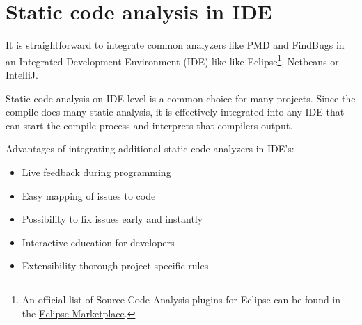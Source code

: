 \documentclass[conference]{IEEEtran}
\begin{document}



\section{Static code analysis in IDE}
\label{sec:static_code_analysis_ide}
It is straightforward to integrate common analyzers like PMD and FindBugs in an Integrated Development Environment (IDE) like like Eclipse\footnote{An official list of Source Code Analysis plugins for Eclipse can be found in the \href{http://marketplace.eclipse.org/taxonomy/term/14,31}{Eclipse Marketplace}.}, Netbeans or IntelliJ.

Static code analysis on IDE level is a common choice for many projects. Since the compile does many static analysis, it is effectively integrated into any IDE that can start the compile process and interprets that compilers output.

Advantages of integrating additional static code analyzers in IDE's:
\begin{itemize}
	\item Live feedback during programming
	\item Easy mapping of issues to code
	\item Possibility to fix issues early and instantly
	\item Interactive education for developers
	\item Extensibility thorough project specific rules
\end{itemize}
\end{document}
